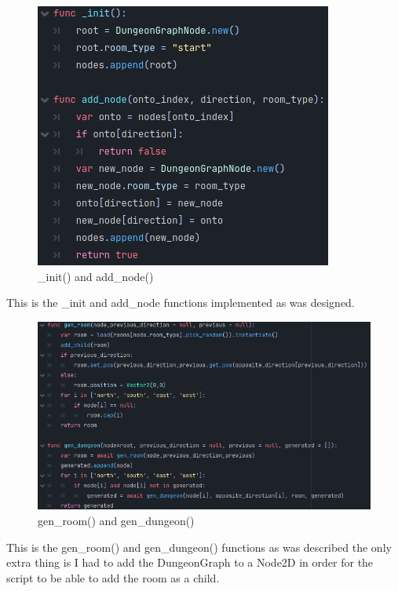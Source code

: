 \documentclass{article}
\begin{document}
        \begin{figure}[H]
                \centering
                \includegraphics[width = 0.8\columnwidth]{images/development/DungeonGraph_init.PNG}
                \caption{\_init() and add\_node()}
        \end{figure}
        This is the \_init and add\_node functions implemented as was designed.\\
        \begin{figure}[H]
                \centering
                \includegraphics[width = 0.8\columnwidth]{images/development/DungeonGraph_gen.PNG}
                \caption{gen\_room() and gen\_dungeon()}
        \end{figure}
        This is the gen\_room() and gen\_dungeon() functions as was described the only extra thing is I had to add the DungeonGraph to a Node2D in order for the script to be able to add the room as a child.\\
\end{document}
